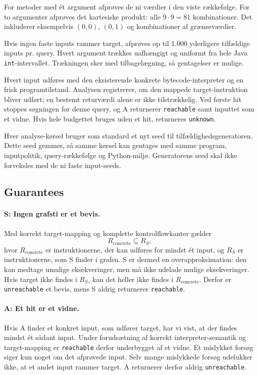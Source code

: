 For metoder med \'et argument afpr{\o}ves de ni v{\ae}rdier i den viste
r{\ae}kkef{\o}lge. For to argumenter afpr{\o}ves det kartesiske produkt:
alle $9 \cdot 9 = 81$ kombinationer. Det inkluderer eksempelvis
$(0,0)$, $(0,1)$ og kombinationer af gr{\ae}nsev{\ae}rdier.

Hvis ingen faste inputs rammer target, afpr{\o}ves op til 1.000 yderligere
tilf{\ae}ldige inputs pr. query. Hvert argument tr{\ae}kkes uafh{\ae}ngigt
og uniformt fra hele Java \texttt{int}-intervallet. Tr{\ae}kningen sker med
tilbagel{\ae}gning, s{\aa} gentagelser er mulige.

Hvert input udf{\o}res med den eksisterende konkrete bytecode-interpreter
og en frisk programtilstand. Analysen registrerer, om den mappede
target-instruktion bliver udf{\o}rt; en bestemt returv{\ae}rdi alene er
ikke tilstr{\ae}kkelig. Ved f{\o}rste hit stoppes s{\o}gningen for denne
query, og A returnerer \texttt{reachable} samt inputtet som et vidne.
Hvis hele budgettet bruges uden et hit, returneres \texttt{unknown}.

Hver analyse-k{\o}rsel bruger som standard et nyt seed til
tilf{\ae}ldighedsgeneratoren. Dette seed gemmes, s{\aa} samme k{\o}rsel kan
gentages med samme program, inputpolitik, query-r{\ae}kkef{\o}lge og
Python-milj{\o}. Generatorens seed skal ikke forveksles med de ni faste
input-seeds.

\subsection{Guarantees}
\paragraph{S: Ingen grafsti er et bevis.}
Med korrekt target-mapping og komplette kontrolflowkanter g{\ae}lder
\[
R_{\mathrm{concrete}} \subseteq R_S,
\]
hvor $R_{\mathrm{concrete}}$ er instruktionerne, der kan udf{\o}res for
mindst \'et input, og $R_S$ er instruktionerne, som S finder i grafen.
S er dermed en overapproksimation: den kan medtage umulige eksekveringer,
men m{\aa} ikke udelade mulige eksekveringer. Hvis target ikke findes i
$R_S$, kan det heller ikke findes i $R_{\mathrm{concrete}}$.
Derfor er \texttt{unreachable} et bevis, mens S aldrig returnerer
\texttt{reachable}.

\paragraph{A: Et hit er et vidne.}
Hvis A finder et konkret input, som udf{\o}rer target, har vi vist, at der
findes mindst \'et s{\aa}dant input. Under foruds{\ae}tning af korrekt
interpreter-semantik og target-mapping er \texttt{reachable} derfor
underbygget af et vidne. Et mislykket fors{\o}g siger kun noget om det
afpr{\o}vede input. Selv mange mislykkede fors{\o}g udelukker ikke, at et
andet input rammer target. A returnerer derfor aldrig \texttt{unreachable}.

